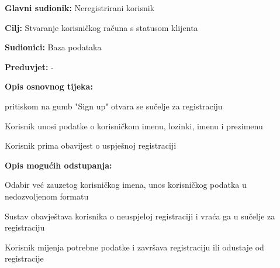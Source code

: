 					\noindent {}
					\begin{packed_item}
	
						\item \textbf{Glavni sudionik: }Neregistrirani korisnik
						\item  \textbf{Cilj:} Stvaranje korisničkog računa s statusom klijenta
						\item  \textbf{Sudionici:} Baza podataka
						\item  \textbf{Preduvjet:} -
						\item  \textbf{Opis osnovnog tijeka:} 
						
						\item[] \begin{packed_enum}
	
							\item pritiskom na gumb "Sign up" otvara se sučelje za registraciju
							\item Korisnik unosi podatke o korisničkom imenu, lozinki, imenu i prezimenu
							\item Korisnik prima obavijest o uspješnoj registraciji
						\end{packed_enum}
						
						\item  \textbf{Opis mogućih odstupanja:}
						
						\item[] \begin{packed_item}
	
							\item[2.a] Odabir već zauzetog korisničkog imena, unos korisničkog podatka u nedozvoljenom formatu
							\item[] \begin{packed_enum}
								
								\item Sustav obavještava korisnika o neuspjeloj registraciji i vraća ga u sučelje za registraciju
								\item Korisnik mijenja potrebne podatke i završava registraciju ili odustaje od registracije
								
							\end{packed_enum}

							
						\end{packed_item}
					\end{packed_item}



